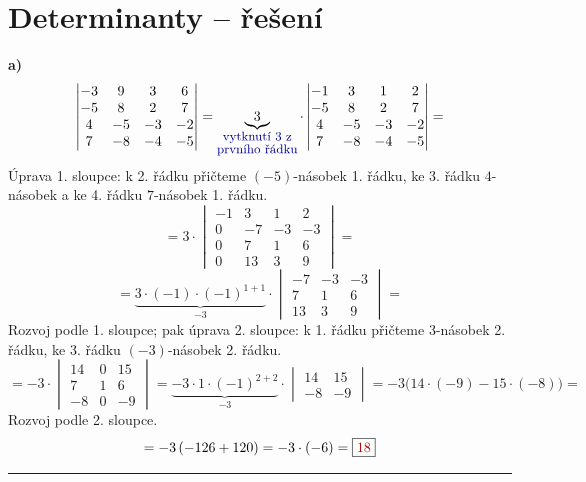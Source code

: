 \documentclass[11pt,a4paper]{article}
\newcommand{\vysl}[1]{\boxed{\color{red!75!black}#1}}
\newcommand{\krok}[1]{{\small\color{blue!60!black}#1}}
\newcommand{\kroku}[1]{\text{\small\color{blue!60!black}#1}}
\begin{document}
\section*{Determinanty -- řešení}

\textbf{a)}
\[
\begin{vmatrix} -3 & 9 & 3 & 6\\ -5 & 8 & 2 & 7\\ 4 & -5 & -3 & -2\\ 7 & -8 & -4 & -5 \end{vmatrix}
= \underbrace{3}_{\substack{\kroku{vytknutí 3 z}\\ \kroku{prvního řádku}}}\cdot
\begin{vmatrix} -1 & 3 & 1 & 2\\ -5 & 8 & 2 & 7\\ 4 & -5 & -3 & -2\\ 7 & -8 & -4 & -5 \end{vmatrix} =
\]
\krok{Úprava 1. sloupce: k 2. řádku přičteme $(-5)$-násobek 1. řádku, ke 3. řádku $4$-násobek a ke 4. řádku $7$-násobek 1. řádku.}
\[
= 3\cdot\begin{vmatrix} -1 & 3 & 1 & 2\\ 0 & -7 & -3 & -3\\ 0 & 7 & 1 & 6\\ 0 & 13 & 3 & 9 \end{vmatrix} =
\]
\[
= \underbrace{3\cdot(-1)\cdot(-1)^{1+1}}_{-3}\cdot
\begin{vmatrix} -7 & -3 & -3\\ 7 & 1 & 6\\ 13 & 3 & 9 \end{vmatrix} =
\]
\krok{Rozvoj podle 1. sloupce; pak úprava 2. sloupce: k 1. řádku přičteme $3$-násobek 2. řádku, ke 3. řádku $(-3)$-násobek 2. řádku.}
\[
= -3\cdot\begin{vmatrix} 14 & 0 & 15\\ 7 & 1 & 6\\ -8 & 0 & -9 \end{vmatrix}
= \underbrace{-3\cdot1\cdot(-1)^{2+2}}_{-3}\cdot\begin{vmatrix} 14 & 15\\ -8 & -9 \end{vmatrix}
= -3\big(14\cdot(-9)-15\cdot(-8)\big) =
\]
\krok{Rozvoj podle 2. sloupce.}
\[
= -3\,(-126+120) = -3\cdot(-6) = \vysl{18}
\]

\medskip
\hrule
\medskip
\end{document}
